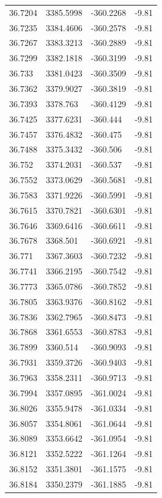 \begin{table}[H]
\begin{tabular}{llll}
36.7204 & 3385.5998 & -360.2268 & -9.81 \\
36.7235 & 3384.4606 & -360.2578 & -9.81 \\
36.7267 & 3383.3213 & -360.2889 & -9.81 \\
36.7299 & 3382.1818 & -360.3199 & -9.81 \\
36.733 & 3381.0423 & -360.3509 & -9.81 \\
36.7362 & 3379.9027 & -360.3819 & -9.81 \\
36.7393 & 3378.763 & -360.4129 & -9.81 \\
36.7425 & 3377.6231 & -360.444 & -9.81 \\
36.7457 & 3376.4832 & -360.475 & -9.81 \\
36.7488 & 3375.3432 & -360.506 & -9.81 \\
36.752 & 3374.2031 & -360.537 & -9.81 \\
36.7552 & 3373.0629 & -360.5681 & -9.81 \\
36.7583 & 3371.9226 & -360.5991 & -9.81 \\
36.7615 & 3370.7821 & -360.6301 & -9.81 \\
36.7646 & 3369.6416 & -360.6611 & -9.81 \\
36.7678 & 3368.501 & -360.6921 & -9.81 \\
36.771 & 3367.3603 & -360.7232 & -9.81 \\
36.7741 & 3366.2195 & -360.7542 & -9.81 \\
36.7773 & 3365.0786 & -360.7852 & -9.81 \\
36.7805 & 3363.9376 & -360.8162 & -9.81 \\
36.7836 & 3362.7965 & -360.8473 & -9.81 \\
36.7868 & 3361.6553 & -360.8783 & -9.81 \\
36.7899 & 3360.514 & -360.9093 & -9.81 \\
36.7931 & 3359.3726 & -360.9403 & -9.81 \\
36.7963 & 3358.2311 & -360.9713 & -9.81 \\
36.7994 & 3357.0895 & -361.0024 & -9.81 \\
36.8026 & 3355.9478 & -361.0334 & -9.81 \\
36.8057 & 3354.8061 & -361.0644 & -9.81 \\
36.8089 & 3353.6642 & -361.0954 & -9.81 \\
36.8121 & 3352.5222 & -361.1264 & -9.81 \\
36.8152 & 3351.3801 & -361.1575 & -9.81 \\
36.8184 & 3350.2379 & -361.1885 & -9.81 \\

\end{tabular}
\end{table}
